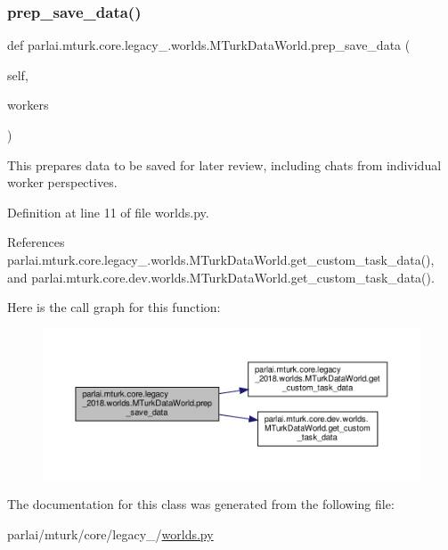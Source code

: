 \subsubsection{\texorpdfstring{prep\+\_\+save\+\_\+data()}{prep\_save\_data()}}
{\footnotesize\ttfamily def parlai.\+mturk.\+core.\+legacy\+\_.\+worlds.\+M\+Turk\+Data\+World.\+prep\+\_\+save\+\_\+data (\begin{DoxyParamCaption}\item[{}]{self,  }\item[{}]{workers }\end{DoxyParamCaption})}

\begin{DoxyVerb}This prepares data to be saved for later review, including
chats from individual worker perspectives.\end{DoxyVerb}
 

Definition at line 11 of file worlds.\+py.



References parlai.\+mturk.\+core.\+legacy\+\_.\+worlds.\+M\+Turk\+Data\+World.\+get\+\_\+custom\+\_\+task\+\_\+data(), and parlai.\+mturk.\+core.\+dev.\+worlds.\+M\+Turk\+Data\+World.\+get\+\_\+custom\+\_\+task\+\_\+data().

Here is the call graph for this function\+:
\nopagebreak
\begin{figure}[H]
\begin{center}
\leavevmode
\includegraphics[width=350pt]{classparlai_1_1mturk_1_1core_1_1legacy__2018_1_1worlds_1_1MTurkDataWorld_ab0fd2eeab0ed799e565c5e97694cd135_cgraph}
\end{center}
\end{figure}


The documentation for this class was generated from the following file\+:\begin{DoxyCompactItemize}
\item 
parlai/mturk/core/legacy\+\_/\hyperlink{parlai_2mturk_2core_2legacy__2018_2worlds_8py}{worlds.\+py}\end{DoxyCompactItemize}
